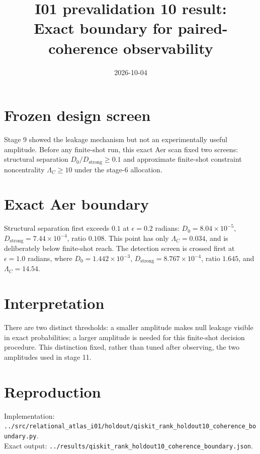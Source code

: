 \documentclass[11pt]{article}
\begin{document}
\title{I01 prevalidation 10 result:\\Exact boundary for paired-coherence observability}
\date{2026-10-04}
\maketitle

\section*{Frozen design screen}
Stage 9 showed the leakage mechanism but not an experimentally useful amplitude.
Before any finite-shot run, this exact Aer scan fixed two screens: structural
separation $D_0/D_{\mathrm{strong}}\geq0.1$ and approximate finite-shot constraint
noncentrality $\Lambda_C\geq10$ under the stage-6 allocation.

\section*{Exact Aer boundary}
Structural separation first exceeds $0.1$ at $\epsilon=0.2$ radians:
$D_0=8.04\times10^{-5}$, $D_{\mathrm{strong}}=7.44\times10^{-4}$, ratio $0.108$.
This point has only $\Lambda_C=0.034$, and is deliberately below finite-shot reach.
The detection screen is crossed first at $\epsilon=1.0$ radians, where
$D_0=1.442\times10^{-3}$, $D_{\mathrm{strong}}=8.767\times10^{-4}$, ratio $1.645$,
and $\Lambda_C=14.54$.

\section*{Interpretation}
There are two distinct thresholds: a smaller amplitude makes null leakage visible
in exact probabilities; a larger amplitude is needed for this finite-shot decision
procedure. This distinction fixed, rather than tuned after observing, the two
amplitudes used in stage 11.

\section*{Reproduction}
Implementation: \texttt{../src/relational\_atlas\_i01/holdout/qiskit\_rank\_holdout10\_coherence\_boundary.py}.\\
Exact output: \texttt{../results/qiskit\_rank\_holdout10\_coherence\_boundary.json}.
\end{document}

